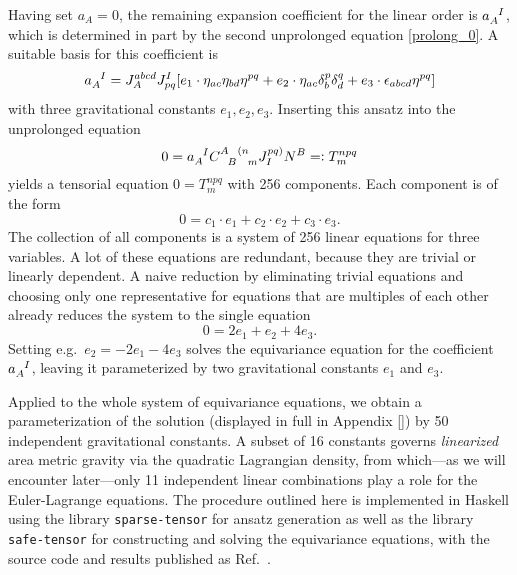 \begin{example}
  Having set $a_A = 0$, the remaining expansion coefficient for the linear order is $a_A^{\hphantom AI}$, which is determined in part by the second unprolonged equation \eqref{prolong_0}. A suitable basis for this coefficient is
  \begin{equation}
    a_A^{\hphantom AI} = J_A^{abcd} J_{pq}^I\lbrack e_1 \cdot \eta_{ac} \eta_{bd} \eta^{pq} + e_2 \cdot \eta_{ac} \delta_b^p \delta_d^q + e_3 \cdot \epsilon_{abcd} \eta^{pq} \rbrack
  \end{equation}
  with three gravitational constants $e_1,e_2,e_3$. Inserting this ansatz into the unprolonged equation
  \begin{equation}
    0 = a_A^{\hphantom AI} \gmc{A}{B}{(n}{m} J^{pq)}_I N^B =\vcentcolon T^{npq}_m
  \end{equation}
  yields a tensorial equation $0 = T^{npq}_m$ with 256 components. Each component is of the form
  \begin{equation}
    0 = c_1\cdot e_1  + c_2\cdot e_2 + c_3\cdot e_3.
  \end{equation}
  The collection of all components is a system of 256 linear equations for three variables. A lot of these equations are redundant, because they are trivial or linearly dependent. A naive reduction by eliminating trivial equations and choosing only one representative for equations that are multiples of each other already reduces the system to the single equation
  \begin{equation}
    0 = 2 e_1 + e_2 + 4 e_3.
  \end{equation}
  Setting e.g.~$e_2 = -2 e_1 -4 e_3$ solves the equivariance equation for the coefficient $a_A^{\hphantom AI}$, leaving it parameterized by two gravitational constants $e_1$ and $e_3$.
\end{example}

Applied to the whole system of equivariance equations, we obtain a parameterization of the solution (displayed in full in Appendix \ref{}) by 50 independent gravitational constants. A subset of 16 constants governs \emph{linearized} area metric gravity via the quadratic Lagrangian density, from which---as we will encounter later---only 11 independent linear combinations play a role for the Euler-Lagrange equations. The procedure outlined here is implemented in Haskell using the library \texttt{sparse-tensor} for ansatz generation as well as the library \texttt{safe-tensor} for constructing and solving the equivariance equations, with the source code and results published as Ref.~\cite{second-order-area-repo}.

